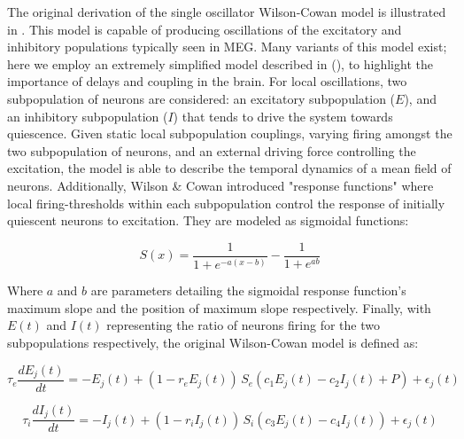 The original derivation of the single oscillator Wilson-Cowan model is illustrated in \cite{Wilson1972}. This model is capable of producing oscillations of the excitatory and inhibitory populations typically seen in MEG. Many variants of this model exist; here we employ an extremely simplified model described in (\cite{Deco2009}), to highlight the importance of delays and coupling in the brain. For local oscillations, two subpopulation of neurons are considered: an excitatory subpopulation ($E$), and an inhibitory subpopulation ($I$) that tends to drive the system towards quiescence. Given static local subpopulation couplings, varying firing amongst the two subpopulation of neurons, and an external driving force controlling the excitation, the model is able to describe the temporal dynamics of a mean field of neurons. Additionally, Wilson \& Cowan introduced "response functions" where local firing-thresholds within each subpopulation control the response of initially quiescent neurons to excitation. They are modeled as sigmoidal functions:   

\begin{equation}
\label{eq:sigmoid}
S(x) = \frac{1}{1+e^{-a(x-b)}} - \frac{1}{1+e^{a b}}
\end{equation}

Where $a$ and $b$ are parameters detailing the sigmoidal response function's maximum slope and the position of maximum slope respectively. Finally, with $E(t)$ and $I(t)$ representing the ratio of neurons firing for the two subpopulations respectively, the original Wilson-Cowan model is defined as:

\begin{equation}
    \label{eq:wco_ex}
\tau_e \frac{dE_{j}(t)}{dt} = -E_{j}(t) + (1 - r_e E_{j}(t)) \, S_e(c_1 E_{j}(t) - c_2 I_{j}(t) + P) + \epsilon_{j} (t)
\end{equation}

\begin{equation}
\label{eq:wco_in}
\tau_i \frac{dI_{j}(t)}{dt} = -I_{j}(t) + (1 - r_i I_{j}(t)) \, S_i(c_3 E_{j}(t) - c_4 I_{j}(t)) + \epsilon_{j} (t)
\end{equation}

